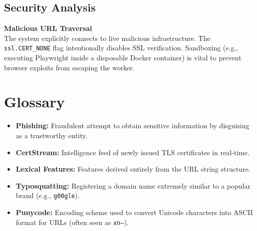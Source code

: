 \documentclass[12pt,a4paper]{report}
\begin{document}
\section{Security Analysis}
\begin{warningbox}
\textbf{Malicious URL Traversal} \\
The system explicitly connects to live malicious infrastructure. The \texttt{ssl.CERT\_NONE} flag intentionally disables SSL verification. Sandboxing (e.g., executing Playwright inside a disposable Docker container) is vital to prevent browser exploits from escaping the worker.
\end{warningbox}

\chapter{Glossary}
\begin{itemize}
\item \textbf{Phishing:} Fraudulent attempt to obtain sensitive information by disguising as a trustworthy entity.
\item \textbf{CertStream:} Intelligence feed of newly issued TLS certificates in real-time.
\item \textbf{Lexical Features:} Features derived entirely from the URL string structure.
\item \textbf{Typosquatting:} Registering a domain name extremely similar to a popular brand (e.g., \texttt{g00gle}).
\item \textbf{Punycode:} Encoding scheme used to convert Unicode characters into ASCII format for URLs (often seen as \texttt{xn--}).
\end{itemize}
\end{document}
